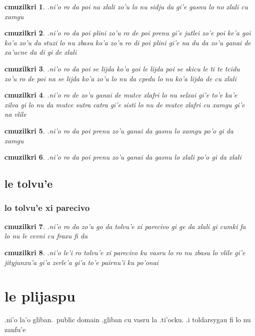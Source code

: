\documentclass{report}
\newtheorem{cmuzilkri}{cmuzilkri}
\begin{document}
\begin{cmuzilkri}
	.ni'o ro da poi na xlali zo'u lo nu sidju da gi'e gasnu lo no xlali cu xamgu
\end{cmuzilkri}
\begin{cmuzilkri}
	.ni'o ro da poi plini zo'u ro de poi prenu gi'e jutlei zo'e poi ke'a goi ko'a zo'u da stuzi lo nu zbasu ko'a zo'u ro di poi plini gi'e na du da zo'u ganai de xa'ucne da di gi de xlali
\end{cmuzilkri}
\begin{cmuzilkri}
	.ni'o ro da poi se lijda ko'a goi le lijda poi se skicu le ti te tcidu zo'u ro de poi na se lijda ko'a zo'u lo nu da cpedu lo nu ko'a lijda de cu xlali
\end{cmuzilkri}
\begin{cmuzilkri}
	.ni'o ro de zo'u ganai de mutce xlafri lo nu selxai gi'e to'e ka'e xilva gi lo nu da mutce sutra catra gi'e sisti lo nu de mutce xlafri cu xamgu gi'e na vlile
\end{cmuzilkri}
\begin{cmuzilkri}
	.ni'o ro da poi prenu zo'u ganai da gasnu lo xamgu po'o gi da xamgu
\end{cmuzilkri}
\begin{cmuzilkri}
	.ni'o ro da poi prenu zo'u ganai da gasnu lo xlali po'o gi da xlali
\end{cmuzilkri}

\section{le tolvu'e}
\subsection{lo tolvu'e xi parecivo}
\begin{cmuzilkri}
	.ni'o ro da zo'u go da tolvu'e xi parecivo gi ge da xlali gi cumki fa lo nu le cevni cu fraxu fi da
\end{cmuzilkri}
\begin{cmuzilkri}
	.ni'o le'i ro tolvu'e xi parecivo ku vasru lo ro nu zbasu lo vlile gi'e jityjunxu'a gi'a zerle'a gi'a to'e pairnu'i ku po'onai
\end{cmuzilkri}

\chapter{le plijaspu}
.ni'o la'o gliban.\ public domain .gliban cu vasru la .ti'ocku.  .i toldarsygau fi lo nu zanfu'e
\end{document}

